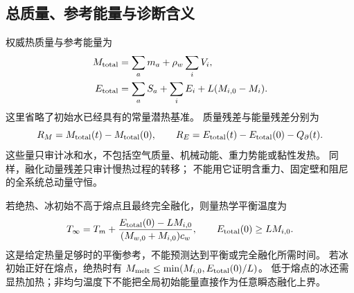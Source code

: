 \subsection{总质量、参考能量与诊断含义}
权威热质量与参考能量为
\begin{align}
 M_{\rm total}&=\sum_a m_a+\rho_w\sum_iV_i,\\
 E_{\rm total}&=\sum_aS_a+\sum_iE_i+L(M_{i,0}-M_i).
 \label{eq:energy-total}
\end{align}
这里省略了初始水已经具有的常量潜热基准。
质量残差与能量残差分别为
\begin{equation}
 R_M=M_{\rm total}(t)-M_{\rm total}(0),\qquad
 R_E=E_{\rm total}(t)-E_{\rm total}(0)-Q_\partial(t).
\end{equation}
这些量只审计冰和水，不包括空气质量、机械动能、重力势能或黏性发热。
同样，融化动量残差只审计慢热过程的转移；
不能用它证明含重力、固定壁和阻尼的全系统总动量守恒。

若绝热、冰初始不高于熔点且最终完全融化，则量热学平衡温度为
\begin{equation}
 T_\infty=T_m+\frac{E_{\rm total}(0)-LM_{i,0}}
 {(M_{w,0}+M_{i,0})c_w},
 \qquad E_{\rm total}(0)\geq LM_{i,0}.
 \label{eq:calorimetry}
\end{equation}
这是给定热量足够时的平衡参考，不能预测达到平衡或完全融化所需时间。
若冰初始正好在熔点，绝热时有
$M_{\rm melt}\leq\min(M_{i,0},E_{\rm total}(0)/L)$。
低于熔点的冰还需显热加热；非均匀温度下不能把全局初始能量直接作为任意瞬态融化上界。
